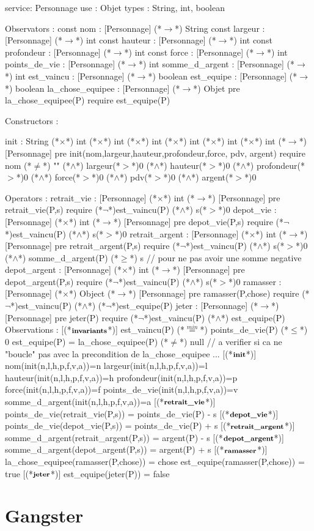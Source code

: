 \documentclass[a4paper, 11pt]{report}
\newcommand{\specB}[1]{\footnotesize\textbf{#1}}
\begin{document}
\begin{Spe}
service: Personnage
use : Objet
types : String, int, boolean

Observators : 
	const nom : [Personnage] (*$\rightarrow$*) String
	const largeur : [Personnage] (*$\rightarrow$*) int
	const hauteur : [Personnage] (*$\rightarrow$*) int
	const profondeur : [Personnage] (*$\rightarrow$*) int
	const force : [Personnage] (*$\rightarrow$*) int 
	points_de_vie : [Personnage] (*$\rightarrow$*) int
	somme_d_argent : [Personnage] (*$\rightarrow$*) int 
	est_vaincu : [Personnage] (*$\rightarrow$*) boolean 
	est_equipe : [Personnage] (*$\rightarrow$*) boolean 
	la_chose_equipee : [Personnage] (*$\rightarrow$*) Objet
		pre la_chose_equipee(P) require est_equipe(P)

Constructors : 

	init : String (*$\times$*) int (*$\times$*) int (*$\times$*) int (*$\times$*) int (*$\times$*) int (*$\times$*) int (*$\rightarrow$*) [Personnage]
		pre init(nom,largeur,hauteur,profondeur,force, pdv, argent) require nom (*$\ne$*) "" (*$\land$*) largeur(*$>$*)0 (*$\land$*) hauteur(*$>$*)0 (*$\land$*) profondeur(*$>$*)0 (*$\land$*) force(*$>$*)0 (*$\land$*) pdv(*$>$*)0 (*$\land$*) argent(*$>$*)0 

Operators :
	retrait_vie :  [Personnage] (*$\times$*) int (*$\rightarrow$*) [Personnage]
		pre retrait_vie(P,s) require (*$\lnot$*)est_vaincu(P) (*$\land$*) s(*$>$*)0
	depot_vie : [Personnage] (*$\times$*) int (*$\rightarrow$*) [Personnage]
		pre depot_vie(P,s) require (*$\lnot$*)est_vaincu(P) (*$\land$*) s(*$>$*)0
	retrait_argent :  [Personnage] (*$\times$*) int (*$\rightarrow$*) [Personnage]
		pre retrait_argent(P,s) require (*$\lnot$*)est_vaincu(P) (*$\land$*) s(*$>$*)0 (*$\land$*) somme_d_argent(P) (*$\ge$*) s // pour ne pas avoir une somme negative
	depot_argent : [Personnage] (*$\times$*) int (*$\rightarrow$*) [Personnage]
		pre depot_argent(P,s) require (*$\lnot$*)est_vaincu(P) (*$\land$*) s(*$>$*)0
	ramasser : [Personnage] (*$\times$*) Object (*$\rightarrow$*) [Personnage]
		pre ramasser(P,chose) require (*$\lnot$*)est_vaincu(P) (*$\land$*) (*$\lnot$*)est_equipe(P)
	jeter : [Personnage] (*$\rightarrow$*) [Personnage]
		pre jeter(P) require (*$\lnot$*)est_vaincu(P) (*$\land$*) est_equipe(P)
Observations : 
	[(*$\specB{invariants}$*)]
		est_vaincu(P) (*$\stackrel{min}{=}$*) points_de_vie(P) (*$\le$*) 0
		est_equipe(P) = la_chose_equipee(P) (*$\ne$*) null // a verifier si ca ne "boucle" pas avec la precondition de la_chose_equipee ...
	[(*$\specB{init}$*)]
		nom(init(n,l,h,p,f,v,a))=n
		largeur(init(n,l,h,p,f,v,a))=l
		hauteur(init(n,l,h,p,f,v,a))=h
		profondeur(init(n,l,h,p,f,v,a))=p
		force(init(n,l,h,p,f,v,a))=f
		points_de_vie(init(n,l,h,p,f,v,a))=v
		somme_d_argent(init(n,l,h,p,f,v,a))=a
	[(*$\specB{retrait\_vie}$*)]
		points_de_vie(retrait_vie(P,s)) = points_de_vie(P) - s
	[(*$\specB{depot\_vie}$*)]
		points_de_vie(depot_vie(P,s)) = points_de_vie(P) + s 
	[(*$\specB{retrait\_argent}$*)]
		somme_d_argent(retrait_argent(P,s)) = argent(P) - s 
	[(*$\specB{depot\_argent}$*)]
		somme_d_argent(depot_argent(P,s)) = argent(P) + s 
	[(*$\specB{ramasser}$*)]
		la_chose_equipee(ramasser(P,chose)) = chose 
		est_equipe(ramasser(P,chose)) = true
	[(*$\specB{jeter}$*)]
		est_equipe(jeter(P)) = false 
\end{Spe}
\section{Gangster}
\begin{Spe}

\end{Spe}
\end{document}
